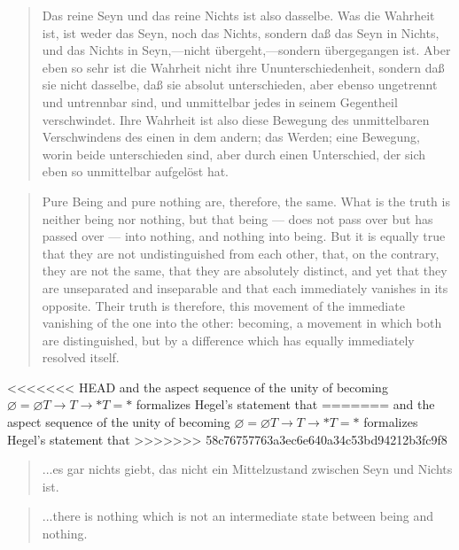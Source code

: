 \documentclass{article}
\begin{document}
\begin{quote}
    Das reine Seyn und das reine Nichts ist also dasselbe. Was die Wahrheit ist, ist weder das Seyn, noch
das Nichts, sondern daß das Seyn in Nichts, und das Nichts in Seyn,—nicht übergeht,—sondern übergegangen
ist. Aber eben so sehr ist die Wahrheit nicht ihre Ununterschiedenheit, sondern daß sie nicht dasselbe,
daß sie absolut unterschieden, aber ebenso ungetrennt und untrennbar sind, und unmittelbar jedes in seinem
Gegentheil verschwindet. Ihre Wahrheit ist also diese Bewegung des unmittelbaren Verschwindens des einen
in dem andern; das Werden; eine Bewegung, worin beide unterschieden sind, aber durch einen Unterschied,
der sich eben so unmittelbar aufgelöst hat.
\end{quote}

\begin{quote}
    Pure Being and pure nothing are, therefore, the same. What is the truth is neither being nor nothing,
but that being — does not pass over but has passed over — into nothing, and nothing into being. But it
is equally true that they are not undistinguished from each other, that, on the contrary, they are not
the same, that they are absolutely distinct, and yet that they are unseparated and inseparable and that
each immediately vanishes in its opposite. Their truth is therefore, this movement of the immediate vanishing
of the one into the other: becoming, a movement in which both are distinguished, but by a difference which
has equally immediately resolved itself.
\end{quote}
    
<<<<<<< HEAD
and the aspect sequence of the unity of becoming $\varnothing = \varnothing T\rightarrow T \rightarrow * T = 
*$ formalizes Hegel's statement that
=======
and the aspect sequence of the unity of becoming $\varnothing = \varnothing T\rightarrow T \rightarrow
* T = *$ formalizes Hegel's statement that
>>>>>>> 58c76757763a3ec6e640a34c53bd94212b3fc9f8

\begin{quote}
    ...es gar nichts giebt, das nicht ein Mittelzustand zwischen Seyn und Nichts ist.
\end{quote}

\begin{quote}
    ...there is nothing which is not an intermediate state between being and nothing.
\end{quote}
\end{document}
